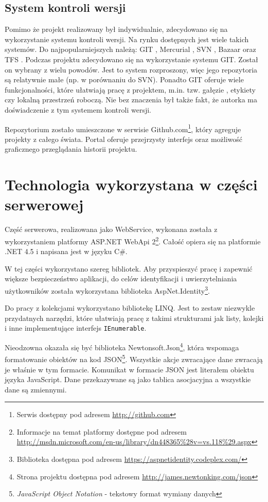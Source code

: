 \documentclass{book}
\begin{document}
			\subsection{System kontroli wersji}
			
			Pomimo że projekt realizowany był indywidualnie, zdecydowano się na wykorzystanie systemu kontroli wersji. Na rynku dostępnych jest wiele takich systemów. Do najpopularniejszych należą: GIT \cite{id:GIT}, Mercurial \cite{id:Mecurial}, SVN \cite{id:SVN}, Bazaar \cite{id:Bazaar} oraz TFS \cite{id:TFS}.
			Podczas projektu zdecydowano się na wykorzystanie systemu GIT. Został on wybrany z wielu powodów. Jest to system rozproszony, więc jego repozytoria są relatywnie małe (np. w porównaniu do SVN). Ponadto GIT oferuje wiele funkcjonalności, które ułatwiają pracę z projektem, m.in. tzw. gałęzie , etykiety czy lokalną przestrzeń roboczą. Nie bez znaczenia był także fakt, że autorka ma doświadczenie z tym systemem kontroli wersji.

			Repozytorium zostało umieszczone w serwisie Github.com\footnote{Serwis dostępny pod adresem \url{http://github.com}}, który agreguje projekty z całego świata. Portal oferuje przejrzysty interfejs oraz możliwość graficznego przeglądania historii projektu.
		
		\section{Technologia wykorzystana w części serwerowej}
		
		Część serwerowa, realizowana jako WebService, wykonana została z wykorzystaniem platformy ASP.NET WebApi 2\footnote{Informacje na temat platformy dostępne pod adresem \url{http://msdn.microsoft.com/en-us/library/dn448365\%28v=vs.118\%29.aspx}}. Całość opiera się na platformie .NET 4.5 i napisana jest w języku C\#.
		
		W tej części wykorzystano szereg bibliotek. Aby przyspieszyć pracę i zapewnić większe bezpieczeństwo aplikacji, do celów identyfikacji i uwierzytelniania użytkowników została wykorzystana biblioteka AspNet.Identity\footnote{Biblioteka dostępna pod adresem \url{https://aspnetidentity.codeplex.com/}}.
		
		Do pracy z kolekcjami wykorzystano bibliotekę LINQ. Jest to zestaw niezwykle przydatnych narzędzi, które ułatwiają pracę z takimi strukturami jak listy, kolejki i inne implementujące interfejs \texttt{IEnumerable}.
		
		Nieodzowna okazała się być biblioteka Newtonsoft.Json\footnote{Strona projektu dostępna pod adresem \url{http://james.newtonking.com/json}}, która wspomaga formatowanie obiektów na kod JSON\footnote{\emph{JavaScript Object Notation} - tekstowy format wymiany danych}. Wszystkie akcje zwracające dane zwracają je właśnie w tym formacie. Komunikat w formacie JSON jest literałem obiektu języka JavaScript. Dane przekazywane są jako tablica asocjacyjna a wszystkie dane są zmiennymi.
		
\end{document}
